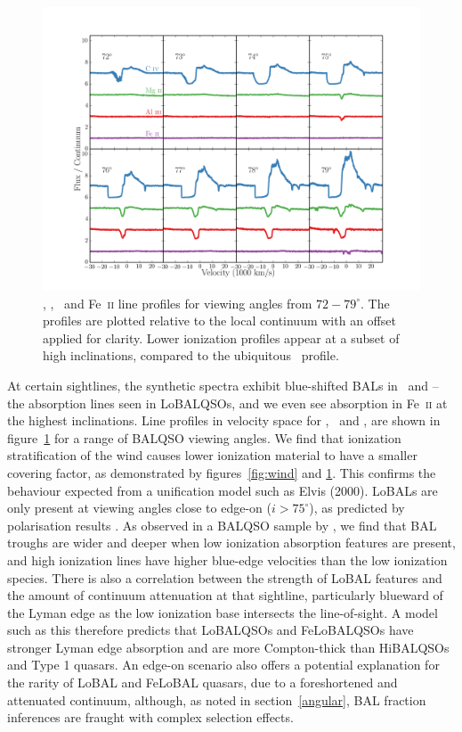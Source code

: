\documentclass[useAMS,usenatbib]{mn2e_x}
\begin{document}
\begin{figure} %
\centering
\includegraphics[width=1.0\textwidth]{figures/c4_angles.png}
\caption
{
\civ , \mg , \al\ and Fe~\textsc{ii} line profiles for viewing angles
from $72-79^\circ$. The profiles are plotted relative to the local
continuum with an offset applied for clarity. Lower ionization
profiles appear at a subset of high inclinations, compared
to the ubiquitous \civ\ profile.
}
\label{fig:lobal}
\end{figure} %


At certain sightlines, the synthetic spectra exhibit blue-shifted BALs in \al\ and \mg --
the absorption lines seen in LoBALQSOs, and we even see absorption in Fe~\textsc{ii}
at the highest inclinations. Line profiles in velocity space 
for \civ, \al\ and \mg, are shown in figure~\ref{fig:lobal} for a range
of BALQSO viewing angles. We find that ionization stratification
of the wind causes lower ionization material to have a smaller covering factor, 
as demonstrated by figures~\ref{fig:wind} and \ref{fig:lobal}.
This confirms the behaviour expected from a unification model such as Elvis (2000). 
LoBALs are only present at viewing angles close to edge-on ($i>75^\circ$),
as predicted by polarisation results \citep{brotherton1997}.
As observed in a BALQSO sample by \cite{filizak2014}, we find that
BAL troughs are wider and deeper when low ionization absorption features are present,
and high ionization lines have higher blue-edge velocities than the 
low ionization species.
There is also a correlation between the strength of LoBAL features
and the amount of continuum attenuation at that sightline, particularly
blueward of the Lyman edge as the low ionization base 
intersects the line-of-sight. 
A model such as this therefore predicts that LoBALQSOs and FeLoBALQSOs 
have stronger Lyman edge absorption and 
are more Compton-thick than HiBALQSOs and Type 1 quasars.
An edge-on scenario also offers a potential explanation for the rarity of LoBAL and
FeLoBAL quasars, due to a foreshortened and attenuated continuum, 
although, as noted in section~\ref{angular}, BAL fraction 
inferences are fraught with complex selection effects.
\end{document}
